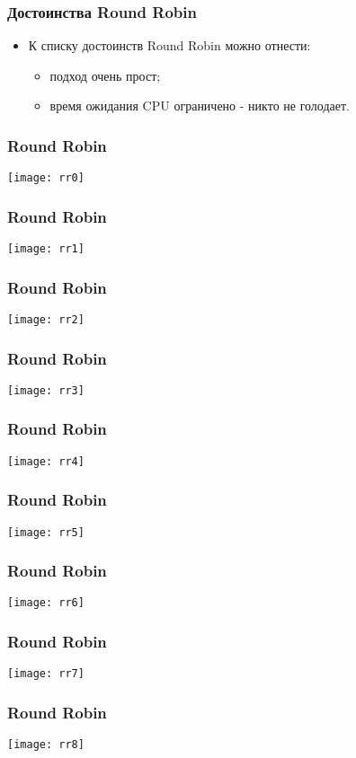 \begin{frame}
\frametitle{Достоинства Round Robin}
\begin{itemize}
    \item<1->К списку достоинств Round Robin можно отнести:
    \begin{itemize}
        \item<2->подход очень прост;
        \item<3->время ожидания CPU ограничено - никто не голодает.
    \end{itemize}
\end{itemize}
\end{frame}

\begin{frame}
\frametitle{Round Robin}
\texttt{[image: rr0]}
\end{frame}

\begin{frame}
\frametitle{Round Robin}
\texttt{[image: rr1]}
\end{frame}

\begin{frame}
\frametitle{Round Robin}
\texttt{[image: rr2]}
\end{frame}

\begin{frame}
\frametitle{Round Robin}
\texttt{[image: rr3]}
\end{frame}

\begin{frame}
\frametitle{Round Robin}
\texttt{[image: rr4]}
\end{frame}

\begin{frame}
\frametitle{Round Robin}
\texttt{[image: rr5]}
\end{frame}

\begin{frame}
\frametitle{Round Robin}
\texttt{[image: rr6]}
\end{frame}

\begin{frame}
\frametitle{Round Robin}
\texttt{[image: rr7]}
\end{frame}

\begin{frame}
\frametitle{Round Robin}
\texttt{[image: rr8]}
\end{frame}

